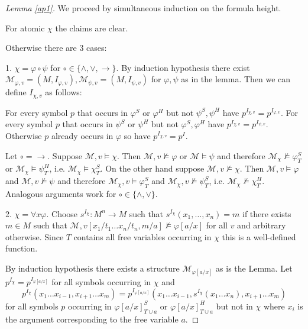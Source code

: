 \documentclass[a4paper,UKenglish,cleveref, autoref, thm-restate]{lipics-v2021}
\begin{document}


\appendix



\begin{proof}[Lemma \ref{ap1}]
	We proceed by simultaneous induction on the formula height.
	
	For atomic $\chi$ the claims are clear.
	
	Otherwise there are $3$ cases:
	
	1. $\chi = \varphi\circ\psi$ for $\circ\in\{\wedge,\vee,\to\}$. By induction hypothesis there exist $\mathcal M_{\varphi, v} = (M, I_{\varphi, v}), \mathcal M_{\psi, v} = (M, I_{\psi, v})$ for $\varphi,\psi$ as in the lemma. Then we can define $I_{\chi, v}$ as follows:
	
	For every symbol $p$ that occurs in $\varphi^S$ or $\varphi^H$ but not $\psi^S, \psi^H$ have $p^{I_{\chi, v}} = p^{I_{\varphi, v}}$. For every symbol $p$ that occurs in $\psi^S$ or $\psi^H$ but not $\varphi^S, \varphi^H$ have $p^{I_{\chi, v}} = p^{I_{\psi, v}}$. Otherwise $p$ already occurs in $\varphi$ so have $p^{I_{\chi, v}} = p^I$.
	
	Let $\circ=\to$. Suppose $\mathcal M, v\models\chi$. Then $\mathcal M, v\not\models\varphi$ or $\mathcal M\models\psi$ and therefore $\mathcal M_\chi\not\models\varphi^S_T$ or $\mathcal M_\chi\models\psi^H_T$, i.e. $\mathcal M_\chi\models\chi^S_T$. On the other hand suppose $\mathcal M, v\not\models\chi$. Then $\mathcal M, v\models\varphi$ and $\mathcal M, v\not\models\psi$ and therefore $\mathcal M_\chi, v\models \varphi^S_T$ and $\mathcal M_\chi, v\not\models\psi^S_T$, i.e. $\mathcal M_\chi\not\models\chi^H_T$. Analogous arguments work for $\circ\in\{\wedge, \vee\}$.
	
	2. $\chi = \forall x\varphi$. Choose $s^{I_\chi}:M^n\to M$ such that $s^{I_\chi}(x_1,\dots, x_n) = m$ if there exists $m\in M$ such that $\mathcal M, v[x_1/t_1\dots x_n/t_n, m/a]\not\models\varphi[a/x]$ for all $v$ and arbitrary otherwise. Since $T$ contains all free variables occurring in $\chi$ this is a well-defined function.
	
	By induction hypothesis there exists a structure $\mathcal M_{\varphi[a/x]}$ as is the Lemma. Let $p^{I_\chi} = p^{I_{\varphi[a/x]}}$ for all symbols occurring in $\chi$ and $$p^{I_\chi}(x_1\dots x_{i-1}, x_{i+1}\dots x_m) = p^{I_{\varphi[a/x]}}(x_1\dots x_{i-1}, s^{I_\chi}(x_1\dots x_n), x_{i+1}\dots x_m)$$ for all symbols $p$ occurring in $\varphi[a/x]^S_{T\cup a}$ or $\varphi[a/x]^H_{T\cup a}$ but not in $\chi$ where $x_i$ is the argument corresponding to the free variable $a$.
	

\end{proof}
\end{document}
